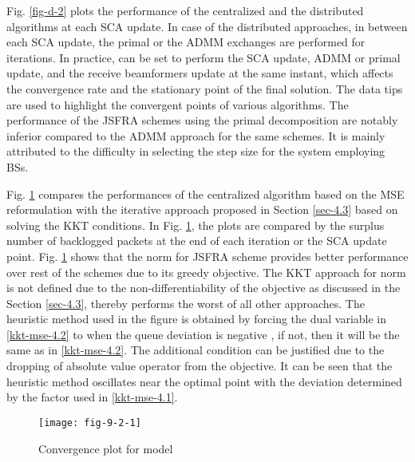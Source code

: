 Fig. \ref{fig-d-2} plots the performance of the centralized and the distributed algorithms at each \ac{SCA} update. In case of the distributed approaches, in between each \ac{SCA} update, the primal or the \ac{ADMM} exchanges are performed for  iterations. In practice,  can be set to perform the \ac{SCA} update, \ac{ADMM} or primal update, and the receive beamformers  update at the same instant, which affects the convergence rate and the stationary point of the final solution. The data tips are used to highlight the convergent points of various algorithms. The performance of the \ac{JSFRA} schemes using the primal decomposition are notably inferior compared to the \ac{ADMM} approach for the same schemes. It is mainly attributed to the difficulty in selecting the step size for the system employing  \acp{BS}.

Fig. \ref{fig-d-3.1} compares the performances of the centralized algorithm based on the \ac{MSE} reformulation with the iterative approach proposed in Section \ref{sec-4.3} based on solving the \ac{KKT} conditions. In Fig. \ref{fig-d-3.1}, the plots are compared by the surplus number of backlogged packets at the end of each iteration or the \ac{SCA} update point. Fig. \ref{fig-d-3.1} shows that the  norm for \ac{JSFRA} scheme provides better performance over rest of the schemes due to its greedy objective. The \ac{KKT} approach for  norm is not defined due to the non-differentiability of the objective as discussed in the Section \ref{sec-4.3}, thereby performs the worst of all other approaches. The heuristic method used in the figure is obtained by forcing the dual variable  in \eqref{kkt-mse-4.2} to  when the queue deviation is negative , if not, then it will be the same as in \eqref{kkt-mse-4.2}. The additional condition can be justified due to the dropping of absolute value operator from the objective. It can be seen that the heuristic method oscillates near the optimal point with the deviation determined by the factor \me{\rho} used in \eqref{kkt-mse-4.1}.
\begin{figure}
\centering
\texttt{[image: fig-9-2-1]}
\caption{Convergence plot for  model}
\label{fig-d-3.1}
\end{figure}

